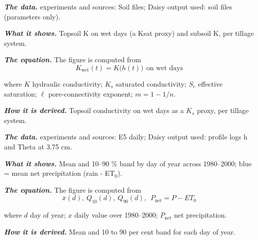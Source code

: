 \par\noindent\textbf{\color{khmag}\emph{The data.}} experiments and sources: Soil files; Daisy output used: soil files (parameters only).
\par\vspace{6pt}\noindent{}\par\nobreak
{}\label{fig:a21_3}
\par\noindent\textbf{\color{khmag}\emph{What it shows.}} Topsoil K on wet days (a Ksat proxy) and subsoil K, per tillage system.
\par\noindent\textbf{\color{khmag}\emph{The equation.}} The figure is computed from
\begin{equation}\boxed{K_{\mathrm{wet}}(t)=K\bigl(h(t)\bigr)\ \ \text{on wet days}}\end{equation}
\par\noindent where $K$ hydraulic conductivity; $K_s$ saturated conductivity; $S_e$ effective saturation; $\ell$ pore-connectivity exponent; $m=1-1/n$.
\par\noindent\textbf{\color{khmag}\emph{How it is derived.}} Topsoil conductivity on wet days as a $K_s$ proxy, per tillage system.
\par\noindent\textbf{\color{khmag}\emph{The data.}} experiments and sources: E5 daily; Daisy output used: profile logs h and Theta at 3.75 cm.
\par\vspace{6pt}\noindent{}\par\nobreak
{}\label{fig:a21_4}
\par\noindent\textbf{\color{khmag}\emph{What it shows.}} Mean and 10--90 \% band by day of year across 1980--2000; blue = mean net precipitation (rain - ET$_0$).
\par\noindent\textbf{\color{khmag}\emph{The equation.}} The figure is computed from
\begin{equation}\boxed{\bar x(d),\ Q_{10}(d),\ Q_{90}(d),\ \ P_{\mathrm{net}}=P-ET_0}\end{equation}
\par\noindent where $d$ day of year; $x$ daily value over 1980--2000; $P_{\mathrm{net}}$ net precipitation.
\par\noindent\textbf{\color{khmag}\emph{How it is derived.}} Mean and 10 to 90 per cent band for each day of year.
